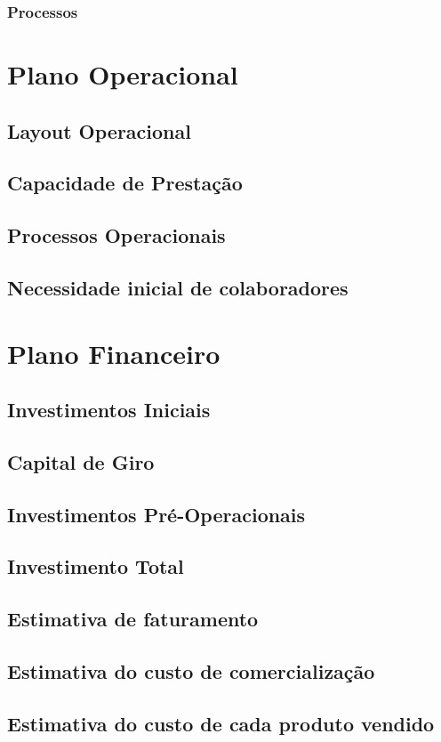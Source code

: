 \documentclass[a4paper, 12pt]{paper}
\begin{document}
\subsubsection{Processos}
\newpage
\section{Plano Operacional}
\subsection{Layout Operacional}
\subsection{Capacidade de Prestação}
\subsection{Processos Operacionais}
\subsection{Necessidade inicial de colaboradores}
\newpage
\section{Plano Financeiro}
\subsection{Investimentos Iniciais}
\subsection{Capital de Giro}
\subsection{Investimentos Pré-Operacionais}
\subsection{Investimento Total}
\subsection{Estimativa de faturamento}
\subsection{Estimativa do custo de comercialização}
\subsection{Estimativa do custo de cada produto vendido}
\end{document}
